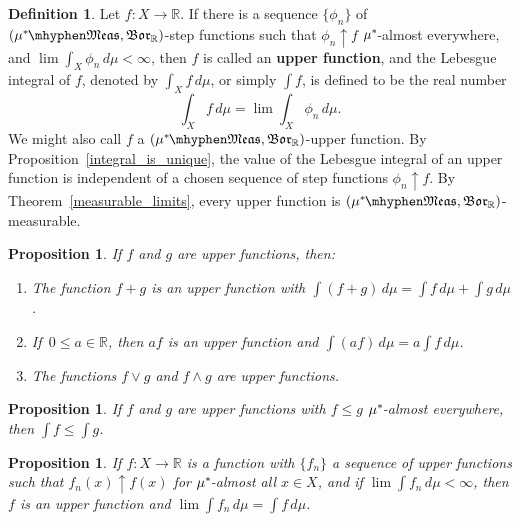 \documentclass[
twoside=true,
paper=letter,
fontsize=9pt,
pagesize=auto,
leqno,
openany,
headsepline,
overfullrule,
]{scrbook}
\theoremstyle{plain}
\theoremstyle{plain}
\newtheorem{prop}[thm]{Proposition}
\theoremstyle{definition}
\newtheorem{defn}[thm]{Definition}
\theoremstyle{bfnoteitalic}
\theoremstyle{bfnoteroman}
\newcommand{\term}[1]{\textbf{#1}\index{#1}}
\newcommand{\borel}{\mathfrak{Bor}}
\newcommand{\R}{\mathbb{R}}
\newcommand{\measurable}[1]{{#1}\mhyphen\mathfrak{Meas}}
\newcommand{\kernast}{\ast\kern-1pt}
\newcommand{\mbmeasurable}{$(\measurable{\measure^\kernast},\borel_\R)$\hyp{}measurable}
\newcommand{\funcf}{f}
\newcommand{\funcg}{g}
\newcommand{\measurespace}{X}
\newcommand{\measure}{\mu}
\newcommand{\measmu}{\mu}
\begin{document}
\begin{defn}\label{upperfunction}
Let $f:\measurespace\to\R$.  If there is a sequence $\{\phi_n\}$ of $(\measurable{\measure^\kernast}, \borel_\R)$-step functions such that $\phi_n\uparrow f$ $\measure^\kernast$-almost everywhere, and $\lim \int_\measurespace\phi_n\,d\measure < \infty$, then $f$ is called an \term{upper function}, and the Lebesgue integral  of $f$, denoted by $\int_\measurespace f\, d\measure$, or simply $\int f$, is  defined to be the real number
\[
\int_\measurespace f\, d\measure
=
\lim \int_\measurespace\phi_n\,d\measure.
\]
We might also call $\funcf$ a
$(\measurable{\measure^\kernast}, \borel_\R)$-upper function.
By Proposition~\ref{integral_is_unique}, the value of the Lebesgue integral of an upper function is independent of a chosen sequence of step functions 
$\phi_n\uparrow f$.
By Theorem~\ref{measurable_limits}, every upper function is \mbmeasurable.
\end{defn}


\begin{prop}\label{upper_function_algebra}
If $\funcf$ and $\funcg$ are upper functions, then:
\begin{enumerate}
\item
The function
$\funcf + \funcg $ is an upper function with
$\int(\funcf + \funcg) \, d\measmu
=
\int \funcf \, d\measmu + \int \funcg \, d\measmu$.
\item
If\, $0 \leq a \in \R$, then
$a\funcf$ is an upper function and
$\int (a\funcf) \, d\measmu
=
a\int \funcf \, d\measmu$.
\item
The functions
$\funcf \vee \funcg$ and $\funcf \wedge \funcg$ are upper functions.
\end{enumerate}
\end{prop}


\begin{prop}
If $f$ and $g$ are upper functions with $f\leq g$ $\measure^\kernast$-almost everywhere, then
$\int f \leq \int g$.
\end{prop}


\begin{prop}\label{upper_monotone}
If $\funcf:\measurespace\to\R$ is a function with
$\{ \funcf_n \}$
a sequence of upper functions such that
$\funcf_n(x) \uparrow \funcf(x)$ for
$\measmu^\kernast$\hyp{}almost all $x\in\measurespace$, and if
$\lim \int \funcf_n \, d\measmu < \infty$, then
$\funcf$ is an upper function and
$\lim \int \funcf_n \, d\measmu = \int \funcf \, d\measmu$.
\end{prop}
\end{document}
